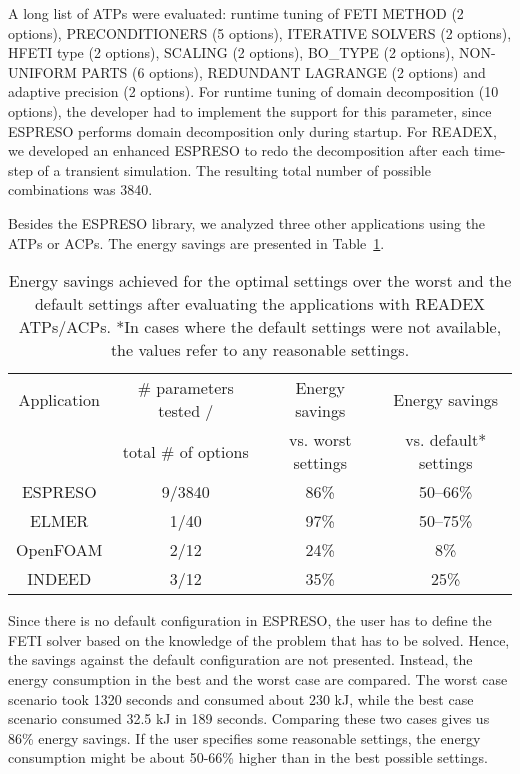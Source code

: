 A long list of ATPs were evaluated: runtime tuning of FETI METHOD (2 options), PRECONDITIONERS (5 options), ITERATIVE SOLVERS (2 options), HFETI type (2 options), SCALING (2 options), BO\_TYPE (2 options), NON-UNIFORM PARTS (6 options), REDUNDANT LAGRANGE (2 options) and adaptive precision (2 options). For runtime tuning of domain decomposition (10 options), the developer had to implement the support for this parameter, since ESPRESO performs domain decomposition only during startup. For READEX, we developed an enhanced ESPRESO to redo the decomposition after each time-step of a transient simulation. The resulting total number of possible combinations was 3840.

Besides the ESPRESO library, we analyzed three other applications using the ATPs or ACPs. The energy savings are presented in Table~\ref{tab:ATPACP}.

\begin{table}[h]
    \centering

    \begin{tabular}{|c|c|c|c|}
    \hline
Application & \# parameters tested /& Energy savings     & Energy savings \\
            & total \# of options      & vs. worst settings & vs. default* settings\\
\hline
ESPRESO     & 9/3840 & 86\% & 50--66\% \\ \hline
ELMER       & 1/40   & 97\% & 50--75\% \\ \hline
OpenFOAM    & 2/12   & 24\% &      8\% \\ \hline
INDEED      & 3/12   & 35\% &     25\% \\ \hline

    \end{tabular}
    \caption{Energy savings achieved for the optimal settings over the worst and the default settings after evaluating the  applications with READEX ATPs/ACPs. *In cases where the default settings were not available, the values refer to any reasonable settings.}
    \label{tab:ATPACP}
\end{table}

Since there is no default configuration in ESPRESO, the user has to define the FETI solver based on the knowledge of the problem that has to be solved. Hence, the savings against the default configuration are not presented. Instead, the energy consumption in the best and the worst case are compared. The worst case scenario took 1320 seconds and consumed about 230 kJ, while the best case scenario consumed 32.5 kJ in 189 seconds. Comparing these two cases gives us 86\% energy savings. If the user specifies some reasonable settings, the energy consumption might be about 50-66\% higher than in the best possible settings.
